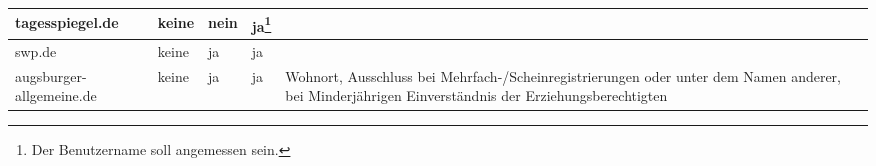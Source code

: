 \begin{longtable}{p{24mm}p{20mm}p{10mm}p{10mm}p{60mm}}
tagesspiegel.de %
& keine
& \centerline{nein}
& \centerline{ja\footnote{Der Benutzername soll angemessen sein.}}
&
\\\midrule

swp.de %
& keine
& \centerline{ja}
& \centerline{ja}
&
\\\midrule

augsburger-allgemeine.de %
& keine
& \centerline{ja}
& \centerline{ja}
& Wohnort, Ausschluss bei Mehrfach-/Scheinregistrierungen oder unter dem Namen
  anderer, bei Minderjährigen Einverständnis der Erziehungsberechtigten
\end{longtable}
\endgroup


